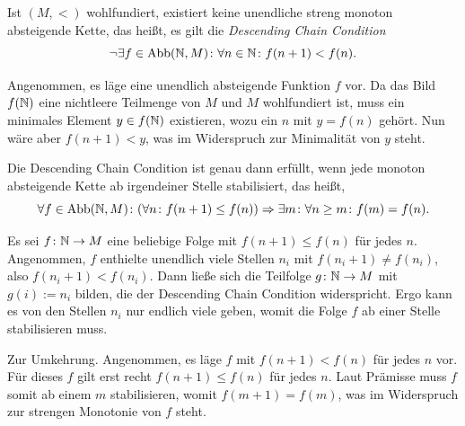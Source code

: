 \begin{Satz}
Ist $(M,<)$ wohlfundiert, existiert keine unendliche streng monoton
absteigende Kette, das heißt, es gilt die \emph{Descending Chain Condition}%
\[\lnot\exists f\in\operatorname{Abb}(\mathbb N,M)\colon \forall n\in\mathbb N\colon f(n+1)<f(n).\]
\end{Satz}
\begin{Beweis}
Angenommen, es läge eine unendlich absteigende Funktion $f$
vor. Da das Bild $f(\mathbb N)$ eine nichtleere Teilmenge von $M$ und $M$
wohlfundiert ist, muss ein minimales Element $y\in f(\mathbb N)$ existieren,
wozu ein $n$ mit $y=f(n)$ gehört. Nun wäre aber $f(n+1)<y$, was im
Widerspruch zur Minimalität von $y$ steht.\,\qedsymbol
\end{Beweis}

\begin{Satz}
Die Descending Chain Condition ist genau dann erfüllt, wenn jede
monoton absteigende Kette ab irgendeiner Stelle stabilisiert, das heißt,
\[\forall f\in\operatorname{Abb}(\mathbb N,M)\colon (\forall n\colon f(n+1)\le f(n))
\Rightarrow\exists m\colon\forall n\ge m\colon f(m)=f(n).\]
\end{Satz}
\begin{Beweis}
Es sei $f\colon\mathbb N\to M$ eine
beliebige Folge mit $f(n+1)\le f(n)$ für jedes $n$. Angenommen, $f$
enthielte unendlich viele Stellen $n_i$ mit $f(n_i+1)\ne f(n_i)$,
also $f(n_i+1)< f(n_i)$. Dann ließe sich die Teilfolge
$g\colon\mathbb N\to M$ mit $g(i):=n_i$ bilden, die der Descending
Chain Condition widerspricht. Ergo kann es von den Stellen $n_i$
nur endlich viele geben, womit die Folge $f$ ab einer Stelle
stabilisieren muss.

Zur Umkehrung. Angenommen, es läge $f$ mit $f(n+1)<f(n)$ für jedes $n$
vor. Für dieses $f$ gilt erst recht $f(n+1)\le f(n)$ für jedes $n$. Laut
Prämisse muss $f$ somit ab einem $m$ stabilisieren, womit $f(m+1)=f(m)$,
was im Widerspruch zur strengen Monotonie von $f$ steht.\,\qedsymbol
\end{Beweis}

